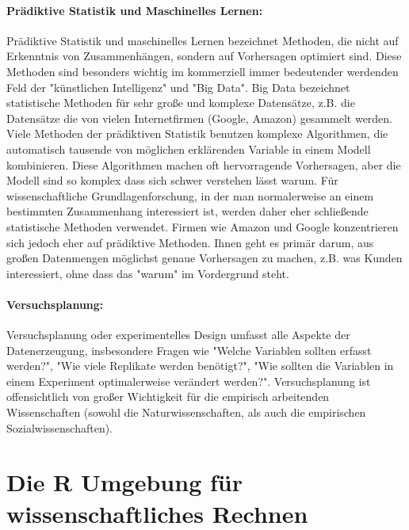 \documentclass[a4paper,twoside]{tufte-book}\usepackage[]{graphicx}\usepackage[]{color}
\begin{document}
	\paragraph{Prädiktive Statistik und Maschinelles Lernen:} Prädiktive Statistik und maschinelles Lernen bezeichnet Methoden, die nicht auf Erkenntnis von Zusammenhängen, sondern auf Vorhersagen optimiert sind. Diese Methoden sind besonders wichtig im kommerziell immer bedeutender werdenden Feld der "künstlichen Intelligenz" und "Big Data". Big Data bezeichnet statistische Methoden für sehr große und komplexe Datensätze,  z.B. die Datensätze die von vielen Internetfirmen (Google, Amazon) gesammelt werden. Viele Methoden der prädiktiven Statistik benutzen komplexe Algorithmen, die automatisch tausende von möglichen erklärenden Variable in einem Modell kombinieren. Diese Algorithmen machen oft hervorragende Vorhersagen, aber die Modell sind so komplex dass sich schwer verstehen lässt warum. Für wissenschaftliche Grundlagenforschung, in der man normalerweise an einem bestimmten Zusammenhang interessiert ist, werden daher eher schließende statistische Methoden verwendet. Firmen wie Amazon und Google konzentrieren sich jedoch eher auf prädiktive Methoden. Ihnen geht es primär darum, aus großen Datenmengen möglichst genaue Vorhersagen zu machen, z.B. was Kunden interessiert, ohne dass das "warum" im Vordergrund steht. 
	
	\paragraph{Versuchsplanung:} Versuchsplanung oder experimentelles Design umfasst alle Aspekte der Datenerzeugung, insbesondere Fragen wie "Welche Variablen sollten erfasst werden?", "Wie viele Replikate werden benötigt?", "Wie sollten die Variablen in einem Experiment optimalerweise verändert werden?". Versuchsplanung ist offensichtlich von großer Wichtigkeit für die empirisch arbeitenden Wissenschaften (sowohl die Naturwissenschaften, als auch die empirischen Sozialwissenschaften). 
	
	\section{Die R Umgebung für wissenschaftliches Rechnen}
	
\end{document}
